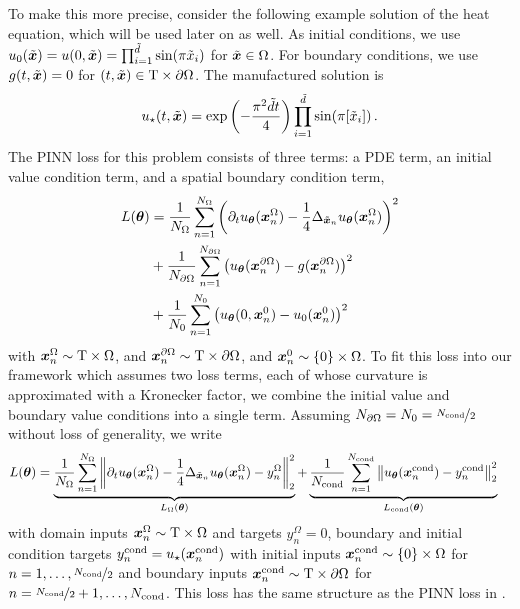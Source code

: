 To make this more precise, consider the following example solution of the heat equation, which will be used later on as well.
As initial conditions, we use $u_0(\tilde{{\bm{x}}}) = u(0, \tilde{{\bm{x}}}) = \prod_{i=1}^{\tilde{d}} \sin(\pi \tilde{{x}}_i)$ for $\tilde{{\bm{x}}} \in \Omega$.
For boundary conditions, we use $g(t, \tilde{{\bm{x}}}) = 0$ for $(t, \tilde{{\bm{x}}}) \in \mathrm{T} \times \partial\Omega$.
The manufactured solution is
\begin{align*}
  u_{\star}(t, \tilde{{\bm{x}}})
  =
  \exp \left(-\frac{\pi^2 \tilde{d} t}{4} \right)
  \prod_{i=1}^{\tilde{d}} \sin(\pi [\tilde{{x}}_i])\,.
\end{align*}
The PINN loss for this problem consists of three terms: a PDE term, an initial value condition term, and a spatial boundary condition term,
\begin{align*}
  L({\bm{\theta}})
  &=
    \frac{1}{N_{\Omega}}
    \sum_{n=1}^{N_{\Omega}}
    \left(
    \partial_t u_{{\bm{\theta}}}({\bm{x}}_n^{\Omega})
    -
    \frac{1}{4} \Delta_{\tilde{{\bm{x}}}_n} u_{{\bm{\theta}}}({\bm{x}}_n^{\Omega})
    \right)^2
  \\
  &+
    \frac{1}{N_{\partial\Omega}}
    \sum_{n=1}^{N_{\partial\Omega}}
    \left(
    u_{{\bm{\theta}}}({\bm{x}}_n^{\partial\Omega})
    -
    g({\bm{x}}_n^{\partial\Omega})
    \right)^2
  \\
  &+
    \frac{1}{N_0}
    \sum_{n=1}^{N_0}
    \left(
    u_{{\bm{\theta}}}(0, {\bm{x}}_n^0)
    -
    u_0( {\bm{x}}_n^0)
    \right)^2
\end{align*}
with ${\bm{x}}_n^{\Omega} \sim \mathrm{T} \times \Omega$, and ${\bm{x}}_n^{\partial\Omega} \sim \mathrm{T} \times \partial\Omega$, and ${\bm{x}}_n^0 \sim \{0\} \times \Omega$.
To fit this loss into our framework which assumes two loss terms, each of whose curvature is approximated with a Kronecker factor, we combine the initial value and boundary value conditions into a single term.
Assuming $N_{\partial \Omega} = N_0 = \nicefrac{N_{\text{cond}}}{2}$ without loss of generality, we write
\begin{align*}
  L({\bm{\theta}})
  &=
    \underbrace{
    \frac{1}{N_{\Omega}}
    \sum_{n=1}^{N_{\Omega}}
    \left\lVert
    \partial_t u_{{\bm{\theta}}}({\bm{x}}_n^{\Omega})
    -
    \frac{1}{4} \Delta_{\tilde{{\bm{x}}}_n} u_{{\bm{\theta}}}({\bm{x}}_n^{\Omega})
    - y_n^{\Omega}
    \right\rVert^2_2
    }_{L_{\Omega}({\bm{\theta}})}
  +
    \underbrace{
    \frac{1}{N_{\text{cond}}}
    \sum_{n=1}^{N_{\text{cond}}}
    \left\lVert
    u_{{\bm{\theta}}}({\bm{x}}_n^{\text{cond}})
    -
    y_n^{\text{cond}}
    \right\rVert^2_2
    }_{L_{\text{cond}}({\bm{\theta}})}
\end{align*}
with domain inputs ${\bm{x}}_n^{\Omega} \sim \mathrm{T} \times \Omega$ and targets $y_n^{\Omega} = 0$, boundary and initial condition targets $y_n^{\text{cond}} = u_\star({\bm{x}}_n^{\text{cond}})$ with initial inputs ${\bm{x}}_n^{\text{cond}} \sim \{0\} \times \Omega$ for $n = 1, \dots, \nicefrac{N_{\text{cond}}}{2}$ and boundary inputs ${\bm{x}}_n^{\text{cond}} \sim \mathrm{T} \times \partial\Omega$ for $n = \nicefrac{N_{\text{cond}}}{2}+1, \dots, N_{\text{cond}}$.
This loss has the same structure as the PINN loss in .

